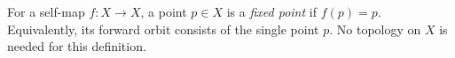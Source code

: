 
For a self-map $f:X\to X$, a point $p\in X$ is a \emph{fixed point} if $f(p)=p$. Equivalently, its forward orbit consists of the single point $p$. No topology on $X$ is needed for this definition.
